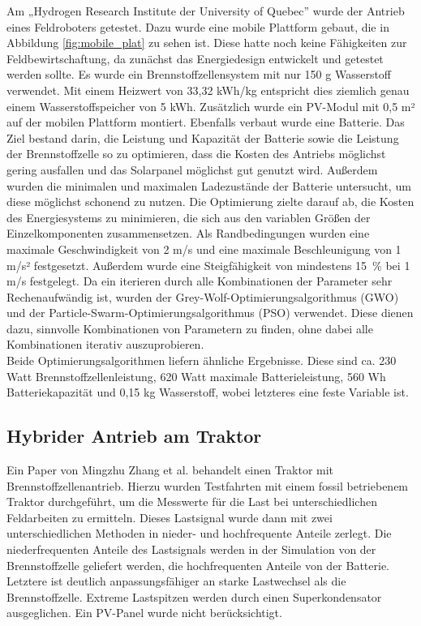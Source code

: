 Am „Hydrogen Research Institute der University of Quebec” wurde der Antrieb eines Feldroboters getestet. Dazu wurde eine mobile Plattform gebaut, die in Abbildung \ref{fig:mobile_plat} zu sehen ist. Diese hatte noch keine Fähigkeiten zur Feldbewirtschaftung, da zunächst das Energiedesign entwickelt und getestet werden sollte. Es wurde ein Brennstoffzellensystem mit nur 150 g Wasserstoff verwendet. Mit einem Heizwert von 33,32 kWh/kg entspricht dies ziemlich genau einem Wasserstoffspeicher von 5 kWh. Zusätzlich wurde ein PV-Modul mit 0,5 m² auf der mobilen Plattform montiert. Ebenfalls verbaut wurde eine Batterie. Das Ziel bestand darin, die Leistung und Kapazität der Batterie sowie die Leistung der Brennstoffzelle so zu optimieren, dass die Kosten des Antriebs möglichst gering ausfallen und das Solarpanel möglichst gut genutzt wird. Außerdem wurden die minimalen und maximalen Ladezustände der Batterie untersucht, um diese möglichst schonend zu nutzen. Die Optimierung zielte darauf ab, die Kosten des Energiesystems zu minimieren, die sich aus den variablen Größen der Einzelkomponenten zusammensetzen. Als Randbedingungen wurden eine maximale Geschwindigkeit von 2 m/s und eine maximale Beschleunigung von 1 m/s² festgesetzt. Außerdem wurde eine Steigfähigkeit von mindestens 15~\% bei 1 m/s festgelegt. 
Da ein iterieren durch alle Kombinationen der Parameter sehr Rechenaufwändig ist, wurden der Grey-Wolf-Optimierungsalgorithmus (GWO) und der Particle-Swarm-Optimierungsalgorithmus (PSO) verwendet. Diese dienen dazu, sinnvolle Kombinationen von Parametern zu finden, ohne dabei alle Kombinationen iterativ auszuprobieren. \cite{ghobadpour_optimal_2023} \\
Beide Optimierungsalgorithmen liefern ähnliche Ergebnisse. Diese sind ca. 230 Watt Brennstoffzellenleistung, 620 Watt maximale Batterieleistung, 560 Wh Batteriekapazität und 0,15 kg Wasserstoff, wobei letzteres eine feste Variable ist. \cite{ghobadpour_optimal_2023} \\


\subsection{Hybrider Antrieb am Traktor}
Ein Paper von Mingzhu Zhang et al. behandelt einen Traktor mit Brennstoffzellenantrieb. Hierzu wurden Testfahrten mit einem fossil betriebenem Traktor durchgeführt, um die Messwerte für die Last bei unterschiedlichen Feldarbeiten zu ermitteln. Dieses Lastsignal wurde dann mit zwei unterschiedlichen Methoden in nieder- und hochfrequente Anteile zerlegt. Die niederfrequenten Anteile des Lastsignals werden in der Simulation von der Brennstoffzelle geliefert werden, die hochfrequenten Anteile von der Batterie. Letztere ist deutlich anpassungsfähiger an starke Lastwechsel als die Brennstoffzelle. Extreme Lastspitzen werden durch einen Superkondensator ausgeglichen. Ein PV-Panel wurde nicht berücksichtigt. \cite{zhang_energy_2024} \\

